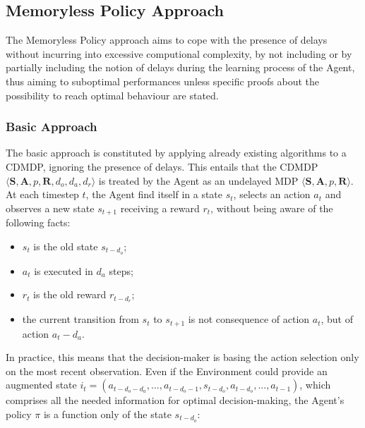         \newpage
        \subsection{Memoryless Policy Approach}
            \label{subs:memorylessapproach}
            The Memoryless Policy approach aims to cope with the presence of delays without incurring into excessive computional complexity, by not including or by partially including the notion of delays during the learning process of the Agent, thus aiming to suboptimal performances unless specific proofs about the possibility to reach optimal behaviour are stated.
            
            \subsubsection{Basic Approach}
                The basic approach is constituted by applying already existing algorithms to a CDMDP, ignoring the presence of delays. This entails that the CDMDP $\langle \mathbf{S}, \mathbf{A}, p, \mathbf{R}, d_o, d_a, d_r \rangle$ is treated by the Agent as an undelayed MDP $\langle \mathbf{S}, \mathbf{A}, p, \mathbf{R} \rangle$. At each timestep $t$, the Agent find itself in a state $s_t$, selects an action $a_t$ and observes a new state $s_{t+1}$ receiving a reward $r_t$, without being aware of the following facts:
                \begin{itemize}[topsep=0.5em, partopsep=0.5em]
                        \setlength\itemsep{0em}
                        \item $s_t$ is the old state $s_{t-d_o}$;
                        \item $a_t$ is executed in $d_a$ steps;
                        \item $r_t$ is the old reward $r_{t-d_r}$;
                        \item the current transition from $s_t$ to $s_{t+1}$ is not consequence of action $a_t$, but of action $a_t-d_a$.
                \end{itemize}
                
                In practice, this means that the decision-maker is basing the action selection only on the most recent observation. Even if the Environment could provide an augmented state $i_t = \left( a_{t-d_{o}-d_{a}}, ..., a_{t-d_{o}-1}, s_{t-d_{o}}, a_{t-d_{o}}, ..., a_{t-1} \right)$, which comprises all the needed information for optimal decision-making, the Agent's policy $\pi$ is a function only of the state $s_{t-d_{o}}$:
                
